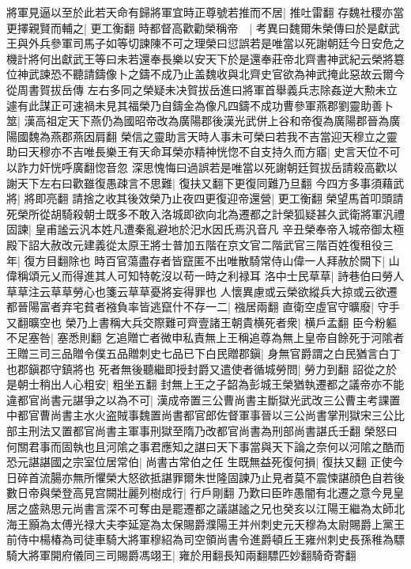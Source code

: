 將軍見逼以至於此若天命有歸將軍宜時正尊號若推而不居|{
	推吐雷翻}
存魏社稷亦當更擇親賢而輔之|{
	更工衡翻}
時都督高歡勸榮稱帝　|{
	考異曰魏爾朱榮傳曰於是獻武王與外兵參軍司馬子如等切諫陳不可之理榮曰愆誤若是唯當以死謝朝廷今日安危之機計將何出獻武王等曰未若還奉長樂以安天下於是還奉莊帝北齊書神武紀云榮將簒位神武諫恐不聽請鑄像卜之鑄不成乃止盖魏收與北齊史官欲為神武掩此惡故云爾今從周書賀拔岳傳}
左右多同之榮疑未决賀拔岳進曰將軍首舉義兵志除姦逆大勲未立遽有此謀正可速禍未見其福榮乃自鑄金為像凡四鑄不成功曹參軍燕郡劉靈助善卜筮|{
	漢高祖定天下燕仍為國昭帝改為廣陽郡後漢光武併上谷和帝復為廣陽郡晉為廣陽國魏為燕郡燕因肩翻}
榮信之靈助言天時人事未可榮曰若我不吉當迎天穆立之靈助曰天穆亦不吉唯長樂王有天命耳榮亦精神恍惚不自支持久而方寤|{
	史言天位不可以詐力奸恍呼廣翻惚音忽}
深思愧悔曰過誤若是唯當以死謝朝廷賀拔岳請殺高歡以謝天下左右曰歡雖復愚疎言不思難|{
	復扶又翻下更復同難乃旦翻}
今四方多事須藉武將|{
	將即亮翻}
請捨之收其後效榮乃止夜四更復迎帝還營|{
	更工衡翻}
榮望馬首叩頭請死榮所從胡騎殺朝士既多不敢入洛城即欲向北為遷都之計榮狐疑甚久武衛將軍汎禮固諫|{
	皇甫謐云汎本姓凡遭秦亂避地於汜水因氏焉汎音凡}
辛丑榮奉帝入城帝御太極殿下詔大赦改元建義從太原王將士普加五階在京文官二階武官三階百姓復租役三年|{
	復方目翻除也}
時百官蕩盡存者皆竄匿不出唯散騎常侍山偉一人拜赦於闕下|{
	山偉稱頌元乂而得進其人可知特乾沒以苟一時之利禄耳}
洛中士民草草|{
	詩巷伯曰勞人草草注云草草勞心也箋云草草憂將妄得罪也}
人懷異慮或云榮欲縱兵大掠或云欲遷都晉陽富者弃宅貧者襁負率皆逃竄什不存一二|{
	襁居兩翻}
直衛空虛官守曠廢|{
	守手又翻曠空也}
榮乃上書稱大兵交際難可齊壹諸王朝貴横死者衆|{
	横戶孟翻}
臣今粉軀不足塞咎|{
	塞悉則翻}
乞追贈亡者微申私責無上王稱追尊為無上皇帝自餘死于河隂者王贈三司三品贈令僕五品贈刺史七品已下白民贈郡鎭|{
	身無官爵謂之白民猶言白丁也郡鎭郡守鎮將也}
死者無後聽繼即授封爵又遣使者循城勞問|{
	勞力到翻}
詔從之於是朝士稍出人心粗安|{
	粗坐五翻}
封無上王之子韶為彭城王榮猶執遷都之議帝亦不能違都官尚書元諶爭之以為不可|{
	漢成帝置三公曹尚書主斷獄光武改三公曹主考課置中都官曹尚書主水火盗賊事魏置尚書都官郎佐督軍事晉以三公尚書掌刑獄宋三公比部主刑法又置都官尚書主軍事刑獄至隋乃改都官尚書為刑部尚書諶氏壬翻}
榮怒曰何關君事而固執也且河隂之事君應知之諶曰天下事當與天下論之奈何以河隂之酷而恐元諶諶國之宗室位居常伯|{
	尚書古常伯之任}
生既無益死復何損|{
	復扶又翻}
正使今日碎首流腸亦無所懼榮大怒欲抵諶罪爾朱世隆固諫乃止見者莫不震悚諶顔色自若後數日帝與榮登高見宫闕壯麗列樹成行|{
	行戶剛翻}
乃歎曰臣昨愚闇有北遷之意今見皇居之盛熟思元尚書言深不可奪由是罷遷都之議諶謐之兄也癸亥以江陽王繼為太師北海王顥為太傅光禄大夫李延寔為太保賜爵濮陽王并州刺史元天穆為太尉賜爵上黨王前侍中楊椿為司徒車騎大將軍穆紹為司空領尚書令進爵頓丘王雍州刺史長孫稚為驃騎大將軍開府儀同三司賜爵馮翊王|{
	雍於用翻長知兩翻驃匹妙翻騎奇寄翻}
